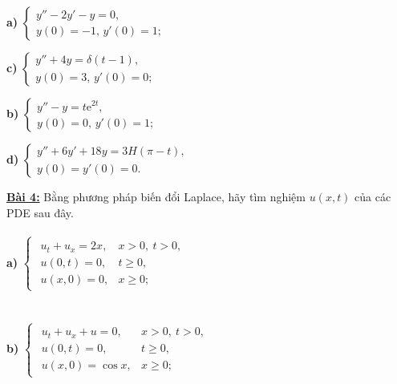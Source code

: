 \documentclass[10pt, a4paper]{article}
\begin{document}
	\begin{multicols}{2}
		\begin{flushleft}
			\textbf{a) }$\begin{cases}
				y''-2y'-y=0,\\
				y(0)=-1,\,y'(0)=1;
			\end{cases}$
		\end{flushleft}
		\begin{flushleft}
			\textbf{c) }$\begin{cases}
				y''+4y=\delta(t-1),\\
				y(0)=3,\,y'(0)=0;
			\end{cases}$
		\end{flushleft}
		\columnbreak
		\begin{flushleft}
			\textbf{b) }$\begin{cases}
				y''-y=t\mathrm e^{2t},\\
				y(0)=0,\,y'(0)=1;
			\end{cases}$
		\end{flushleft}
		\begin{flushleft}
		\textbf{d) }$\begin{cases}
			y''+6y'+18y=3H(\pi-t),\\
			y(0)=y'(0)=0.
		\end{cases}$
		\end{flushleft}
	\end{multicols}
	\color{red}\textbf{\underline{Bài 4:}} \color{black}Bằng phương pháp biến đổi Laplace, hãy tìm nghiệm $u(x,t)$ của các PDE sau đây.\\\\
	\textbf{a) }$\begin{cases}
		\begin{array}{ll}
			u_t+u_x=2x, & x>0,~t>0, \\
			u(0,t)=0, & t\ge0,\\
			u(x,0)=0, & x\ge0;
		\end{array}
	\end{cases}$\\\\\\
	\textbf{b) }$\begin{cases}
		\begin{array}{ll}
			u_t+u_x+u=0, & x>0,~t>0, \\
			u(0,t)=0, & t\ge0,\\
			u(x,0)=\cos x, & x\ge0;
		\end{array}
	\end{cases}$\\\\\\
\end{document}
